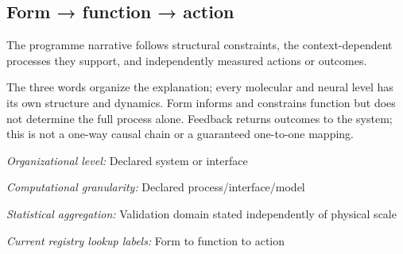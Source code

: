 \begin{samepage}
\subsection*{Form → function → action}
\noindent The programme narrative follows structural constraints, the context-dependent processes they support, and independently measured actions or outcomes.\par
\end{samepage}
\noindent The three words organize the explanation; every molecular and neural level has its own structure and dynamics. Form informs and constrains function but does not determine the full process alone. Feedback returns outcomes to the system; this is not a one-way causal chain or a guaranteed one-to-one mapping.\par
\noindent\textit{Organizational level:} Declared system or interface\par
\noindent\textit{Computational granularity:} Declared process/interface/model\par
\begin{samepage}
\noindent\textit{Statistical aggregation:} Validation domain stated independently of physical scale\par\nopagebreak[4]

\end{samepage}


\noindent\textit{Current registry lookup labels:} Form to function to action\par

